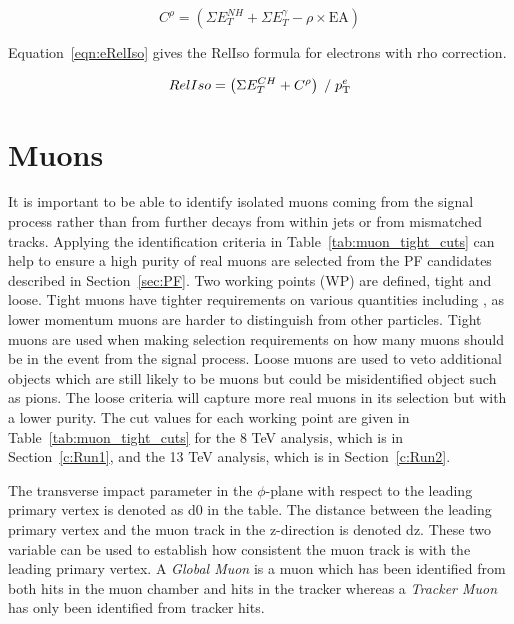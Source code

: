\begin{centering}
\begin{equation}
C^{\rho} = \left( \Sigma E_{T}^{NH} + \Sigma E_{T}^{\gamma} - \rho\times\textrm{EA} \right) 
\label{eqn:rhoCorr}
\end{equation}
\end{centering}

Equation~\ref{eqn:eRelIso} gives the RelIso formula for electrons with rho correction.

\begin{centering}
\begin{equation}
RelIso = \left( \Sigma E_{T}^{CH} + C^{\rho} \right) \; / \;   p_{\mathrm{T}}^{e}
\label{eqn:eRelIso}
\end{equation}
\end{centering}

\section{Muons \label{sec:muonreco}}

It is important to be able to identify isolated muons coming from the signal process rather than from further decays from within jets or from mismatched tracks. Applying the identification criteria in Table~\ref{tab:muon_tight_cuts} can help to ensure a high purity of real muons are selected from the PF candidates described in Section~\ref{sec:PF}. Two working points (WP) are defined, tight and loose. Tight muons have tighter requirements on various quantities including \pt, as lower momentum muons are harder to distinguish from other particles. Tight muons are used when making selection requirements on how many muons should be in the event from the signal process. Loose muons are used to veto additional objects which are still likely to be muons but could be misidentified object such as pions. The loose criteria will capture more real muons in its selection but with a lower purity.
The cut values for each working point are given in Table~\ref{tab:muon_tight_cuts} for the 8 TeV analysis, which is in Section~\ref{c:Run1}, and the 13 TeV analysis, which is in Section~\ref{c:Run2}.

The transverse impact parameter in the $\phi$-plane with respect to the leading primary vertex is denoted as d0 in the table. The distance between the leading primary vertex and the muon track in the z-direction is denoted dz. These two variable can be used to establish how consistent the muon track is with the leading primary vertex.
A \emph{Global Muon} is a muon which has been identified from both hits in the muon chamber and hits in the tracker whereas a \emph{Tracker Muon} has only been identified from tracker hits.



